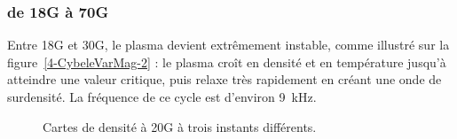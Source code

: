 \begin{refsection}
\subsubsection{de 18G à 70G}
Entre 18G et 30G, le plasma devient extrêmement instable, comme illustré
sur la figure~\ref{4-CybeleVarMag-2} : le plasma croît en
densité et en température jusqu'à atteindre une valeur critique, puis relaxe
très rapidement en créant une onde de surdensité. La fréquence de ce cycle
est d'environ 9~kHz.
\begin{figure}[htbp]
  \centering
    \caption{Cartes de densité à 20G à trois instants
    différents.}

\end{figure}
\end{refsection}
